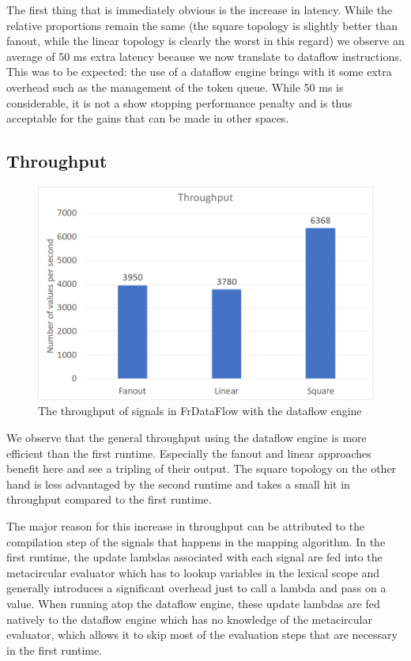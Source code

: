 The first thing that is immediately obvious is the increase in latency. While the relative proportions remain the same (the square topology is slightly better than fanout, while the linear topology is clearly the worst in this regard) we observe an average of 50 ms extra latency because we now translate to dataflow instructions. This was to be expected: the use of a dataflow engine brings with it some extra overhead such as the management of the token queue. While 50 ms is considerable, it is not a show stopping performance penalty and is thus acceptable for the gains that can be made in other spaces.

\subsection{Throughput}

\begin{figure}[h]
	\includegraphics[width=\textwidth]{images/Evaluation-WithDataFlow-Throughput.png}
	\caption{The throughput of signals in FrDataFlow with the dataflow engine}
	\label{fig:evaluation-withdataflow-throughput}
\end{figure}

We observe that the general throughput using the dataflow engine is more efficient than the first runtime. 
Especially the fanout and linear approaches benefit here and see a tripling of their output. The square topology on the other hand is less advantaged by the second runtime and takes a small hit in throughput compared to the first runtime.

The major reason for this increase in throughput can be attributed to the compilation step of the signals that happens in the mapping algorithm. In the first runtime, the update lambdas associated with each signal are fed into the metacircular evaluator which has to lookup variables in the lexical scope and generally introduces a significant overhead just to call a lambda and pass on a value. When running atop the dataflow engine, these update lambdas are fed natively to the dataflow engine which has no knowledge of the metacircular evaluator, which allows it to skip most of the evaluation steps that are necessary in the first runtime.

